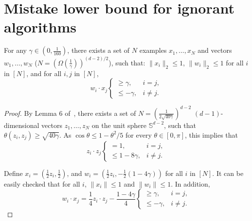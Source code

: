 \section{Mistake lower bound for ignorant algorithms}

\begin{lemma}
For any $\gamma \in (0,\frac 1 {160})$,
there exists a set of $N$ examples $x_1, \ldots, x_N$ and vectors $w_1, \ldots, w_N$ ($N = (\Omega(\frac{1}{\gamma}))^{(d-2)/2}$), such that:
$\| x_i \|_2 \leq 1$, $\| w_i \|_2 \leq 1$ for all $i$ in $[N]$, and for all $i, j$ in $[N]$,
\[ w_i \cdot x_j \begin{cases} \geq \gamma ,& i = j, \\ \leq -\gamma ,& i \neq j. \end{cases} \]
\label{lem:embed_d_gamma}
\end{lemma}
\begin{proof}
By Lemma 6 of~\cite{Long-1995}, there exists a set of $N = (\frac{1}{2\sqrt{40\gamma}})^{d-2}$ $(d-1)$-dimensional vectors $z_1, \ldots, z_N$ on the unit sphere $\mathbb{S}^{d-2}$, such that
$\theta(z_i, z_j) \geq \sqrt{40 \gamma}$. As $\cos\theta \leq 1-\theta^2/5$ for every $\theta \in [0,\pi]$,
this implies that
\[ z_i \cdot z_j \begin{cases} = 1 ,& i = j, \\ \leq 1- 8\gamma ,& i \neq j. \end{cases} \]

Define $x_i = (\frac12 z_i, \frac12)$, and $w_i = (\frac 12 z_i, -\frac 12(1-4\gamma))$ for all $i$ in $[N]$. It can be easily checked that for all $i$, $\|x_i\| \leq 1$ and $\|w_i\| \leq 1$. In addition,
\[ w_i \cdot x_j = \frac 1 4 z_i \cdot z_j - \frac {1-4\gamma} 4 \begin{cases} \geq \gamma ,& i = j, \\ \leq -\gamma ,& i \neq j. \end{cases}\]
\end{proof}
